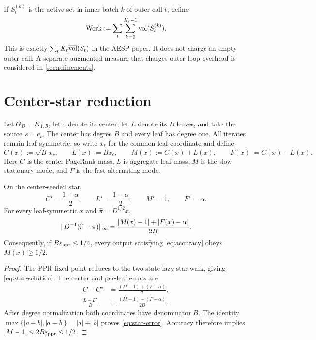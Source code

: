 \documentclass[11pt]{article}
\begin{document}
\begin{definition}
\label{def:work}
If $S_t^{(k)}$ is the active set in inner batch $k$ of outer call $t$, define
\begin{equation}
  \operatorname{Work}:=\sum_t\sum_{k=0}^{K_t-1}\operatorname{vol}(S_t^{(k)}),
  \label{eq:work}
\end{equation}
This is exactly $\sum_t K_t\overline{\operatorname{vol}}(S_t)$ in the AESP paper.  It does
not charge an empty outer call.  A separate augmented measure that charges
outer-loop overhead is considered in \cref{sec:refinements}.
\end{definition}

\section{Center-star reduction}
\label{sec:star}

Let $G_B=K_{1,B}$, let $c$ denote its center, let $L$ denote its $B$ leaves,
and take the source $s=e_c$.  The center has degree $B$ and every leaf has
degree one.  All iterates remain leaf-symmetric, so write $x_\ell$ for the
common leaf coordinate and define
\begin{equation}
  C(x):=\sqrt{B}\,x_c,
  \qquad
  L(x):=B x_\ell,
  \qquad
  M(x):=C(x)+L(x),
  \qquad
  F(x):=C(x)-L(x).
  \label{eq:mass-coordinates}
\end{equation}
Here $C$ is the center PageRank mass, $L$ is aggregate leaf mass, $M$ is the
slow stationary mode, and $F$ is the fast alternating mode.

\begin{lemma}
\label{lem:norm-conversion}
On the center-seeded star,
\begin{equation}
  C^\star=\frac{1+\alpha}{2},
  \qquad
  L^\star=\frac{1-\alpha}{2},
  \qquad
  M^\star=1,
  \qquad
  F^\star=\alpha.
  \label{eq:star-solution}
\end{equation}
For every leaf-symmetric $x$ and $\widehat\pi=D^{1/2}x$,
\begin{equation}
  \lVert D^{-1}(\widehat\pi-\pi)\rVert_\infty
  =\frac{
      \left\lvert M(x)-1 \right\rvert+\left\lvert F(x)-\alpha \right\rvert
    }{2B}.
  \label{eq:star-error}
\end{equation}
Consequently, if $B\varepsilon_{\mathrm{ppr}}\leq 1/4$, every output satisfying
\cref{eq:accuracy} obeys $M(x)\geq 1/2$.
\end{lemma}

\begin{proof}
The PPR fixed point reduces to the two-state lazy star walk, giving
\cref{eq:star-solution}.  The center and per-leaf errors are
\begin{align*}
  C-C^\star
  &=\frac{(M-1)+(F-\alpha)}2,\\
  \frac{L-L^\star}{B}
  &=\frac{(M-1)-(F-\alpha)}{2B}.
\end{align*}
After degree normalization both coordinates have denominator $B$.  The
identity $\max\{|a+b|,|a-b|\}=|a|+|b|$ proves
\cref{eq:star-error}.  Accuracy therefore implies
$|M-1|\leq2B\varepsilon_{\mathrm{ppr}}\leq1/2$.
\end{proof}
\end{document}
